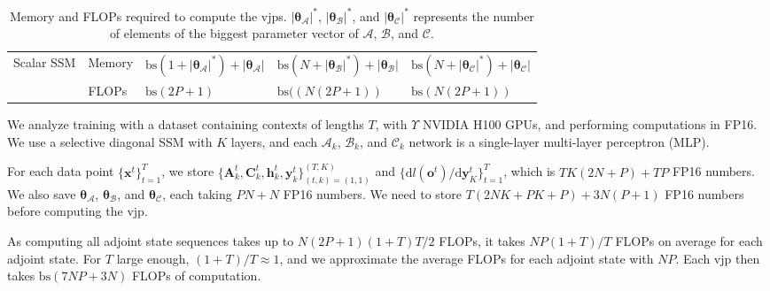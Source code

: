 \documentclass{article}
\newcommand{\A}{\mathcal{A}}
\newcommand{\B}{\mathcal{B}}
\newcommand{\C}{\mathcal{C}}
\newcommand{\vjp}{\mathrm{vjp}}
\newcommand{\diff}{\mathrm{d}}
\begin{document}
\begin{table}[hbt!]
{\begin{tabular}{lllll}
\multirow{2}{*}{Scalar SSM}       & Memory & $\mathrm{bs}(1+|\boldsymbol{\theta}_{\boldsymbol{\A}}|^*)+|\boldsymbol{\theta}_{\boldsymbol{\A}}|$                                                                                                                                         & $\mathrm{bs}(N+|\boldsymbol{\theta}_{\boldsymbol{\B}}|^*)+|\boldsymbol{\theta}_{\boldsymbol{\B}}|$  & $\mathrm{bs}(N+|\boldsymbol{\theta}_{\boldsymbol{\C}}|^*)+|\boldsymbol{\theta}_{\boldsymbol{\C}}|$ \\
                                  & FLOPs  & $\mathrm{bs}(2P+1)$                                                                                                                                                                                                 & $\mathrm{bs}((N(2P+1))$                                                         & $\mathrm{bs}(N(2P+1))$   \\ \bottomrule                                                    
\end{tabular}
}
\caption{Memory and FLOPs required to compute the $\vjp$s. $|\boldsymbol{\theta}_{\boldsymbol{\A}}|^*$, $|\boldsymbol{\theta}_{\boldsymbol{\B}}|^*$, and $|\boldsymbol{\theta}_{\boldsymbol{\C}}|^*$ represents the number of elements of the biggest parameter vector of $\boldsymbol{\A}$, $\boldsymbol{\B}$, and $\boldsymbol{\C}$.}
\label{tab:vjpMemFlop}
\end{table}

We analyze training with a dataset containing contexts of lengths $T$, with $\Upsilon$ NVIDIA H100 GPUs, and performing computations in FP16. We use a selective diagonal SSM with $K$ layers, and each $\boldsymbol{\A}_k$, $\boldsymbol{\B}_k$, and $\boldsymbol{\C}_k$ network is a single-layer multi-layer perceptron (MLP). 

For each data point $\{\mathbf{x}^t\}_{t=1}^T$, we store $\{\mathbf{A}^t_k, \mathbf{C}^t_k, \mathbf{h}^t_k, \mathbf{y}^t_k\}_{(t,k)=(1,1)}^{(T,K)}$ and $\{\diff l(\mathbf{o}^t)/\diff \mathbf{y}_K^t\}_{t=1}^T$, which is $TK(2N+P)+TP$ FP16 numbers. We also save $\boldsymbol{\theta}_{\boldsymbol{\A}}$, $\boldsymbol{\theta}_{\boldsymbol{\B}}$, and $\boldsymbol{\theta}_{\boldsymbol{\C}}$, each taking $PN+N$ FP16 numbers. We need to store $T(2NK+PK+P)+3N(P+1)$ FP16 numbers before computing the  $\vjp$.

As computing all adjoint state sequences takes up to $N(2P+1)(1+T)T/2$ FLOPs, it takes $NP(1+T)/T$ FLOPs on average for each adjoint state. For $T$ large enough, $(1+T)/T\approx 1$, and we approximate the average FLOPs for each adjoint state with $NP$. Each $\vjp$ then takes $\mathrm{bs}(7NP+3N)$ FLOPs of computation. 
\end{document}
